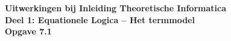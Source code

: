 \documentclass[a4paper,11pt]{article}
\begin{document}
{\bf Uitwerkingen bij Inleiding Theoretische Informatica\\
Deel 1: Equationele Logica -- Het termmodel}\\[2em]


{\bf Opgave 7.1}
\end{document}
